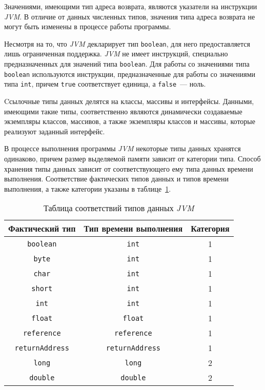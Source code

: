 Значениями, имеющими тип адреса возврата, являются указатели на инструкции \textit{JVM}. В отличие от данных численных типов, значения типа адреса возврата не 
могут быть изменены в процессе работы программы.

Несмотря на то, что \textit{JVM} декларирует тип \texttt{boolean}, для него предоставляется лишь ограниченная поддержка. \textit{JVM} не имеет инструкций, 
специально предназначенных для значений типа \texttt{boolean}. Для работы со значениями типа \texttt{boolean} используются инструкции, предназначенные для 
работы со значениями типа \texttt{int}, причем \texttt{true} соответствует единица, а \texttt{false}~--- ноль.

Cсылочные типы данных делятся на классы, массивы и интерфейсы. Данными, имеющими такие типы, соответственно являются динамически создаваемые экземпляры 
классов, массивов, а также экземпляры классов и массивы, которые реализуют заданный интерфейс.

В процессе выполнения программы \textit{JVM} некоторые типы данных хранятся одинаково, причем размер выделяемой памяти зависит от категории типа. Способ 
хранения типы данных зависит от соответствующего ему типа данных времени выполнения. Соответствие фактических типов данных и типов времени выполнения, а также 
категории указаны в таблице~\ref{tab:type_compatibility}.

\begin{table}[ht]
\caption{Таблица соответствий типов данных \textit{JVM}}
\label{tab:type_compatibility}
\begin{tabular}{|c|c|c|}
\hline
Фактический тип & Тип времени выполнения & Категория \\
\hline
\texttt{boolean} & \texttt{int} & 1 \\
\hline
\texttt{byte} & \texttt{int} & 1 \\
\hline
\texttt{char} & \texttt{int} & 1 \\
\hline
\texttt{short} & \texttt{int} & 1 \\
\hline
\texttt{int} & \texttt{int} & 1 \\
\hline
\texttt{float} & \texttt{float} & 1 \\
\hline
\texttt{reference} & \texttt{reference} & 1 \\
\hline
\texttt{returnAddress} & \texttt{returnAddress} & 1 \\ 
\hline
\texttt{long} & \texttt{long} & 2 \\
\hline
\texttt{double} & \texttt{double} & 2 \\
\hline
\end{tabular}
\end{table}

